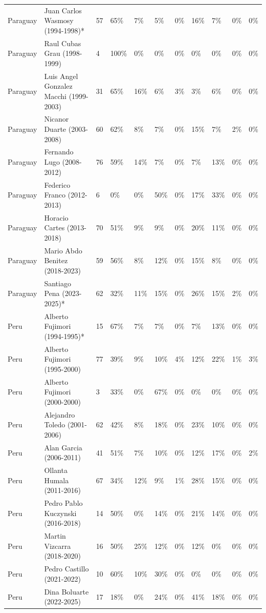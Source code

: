 \documentclass[11pt,a4paper]{article}
\begin{document}
\begin{longtable}{lllllllllll}
  Paraguay & Juan Carlos Wasmosy (1994-1998)* & 57 & 65\% & 7\% & 5\% & 0\% & 16\% & 7\% & 0\% & 0\% \\ 
  Paraguay & Raul Cubas Grau (1998-1999) & 4 & 100\% & 0\% & 0\% & 0\% & 0\% & 0\% & 0\% & 0\% \\ 
  Paraguay & Luis Angel Gonzalez Macchi (1999-2003) & 31 & 65\% & 16\% & 6\% & 3\% & 3\% & 6\% & 0\% & 0\% \\ 
  Paraguay & Nicanor Duarte (2003-2008) & 60 & 62\% & 8\% & 7\% & 0\% & 15\% & 7\% & 2\% & 0\% \\ 
  Paraguay & Fernando Lugo (2008-2012) & 76 & 59\% & 14\% & 7\% & 0\% & 7\% & 13\% & 0\% & 0\% \\ 
  Paraguay & Federico Franco (2012-2013) & 6 & 0\% & 0\% & 50\% & 0\% & 17\% & 33\% & 0\% & 0\% \\ 
  Paraguay & Horacio Cartes (2013-2018) & 70 & 51\% & 9\% & 9\% & 0\% & 20\% & 11\% & 0\% & 0\% \\ 
  Paraguay & Mario Abdo Benitez (2018-2023) & 59 & 56\% & 8\% & 12\% & 0\% & 15\% & 8\% & 0\% & 0\% \\ 
  Paraguay & Santiago Pena (2023-2025)* & 62 & 32\% & 11\% & 15\% & 0\% & 26\% & 15\% & 2\% & 0\% \\ 
  Peru & Alberto Fujimori (1994-1995)* & 15 & 67\% & 7\% & 7\% & 0\% & 7\% & 13\% & 0\% & 0\% \\ 
  Peru & Alberto Fujimori (1995-2000) & 77 & 39\% & 9\% & 10\% & 4\% & 12\% & 22\% & 1\% & 3\% \\ 
  Peru & Alberto Fujimori (2000-2000) & 3 & 33\% & 0\% & 67\% & 0\% & 0\% & 0\% & 0\% & 0\% \\ 
  Peru & Alejandro Toledo (2001-2006) & 62 & 42\% & 8\% & 18\% & 0\% & 23\% & 10\% & 0\% & 0\% \\ 
  Peru & Alan Garcia (2006-2011) & 41 & 51\% & 7\% & 10\% & 0\% & 12\% & 17\% & 0\% & 2\% \\ 
  Peru & Ollanta Humala (2011-2016) & 67 & 34\% & 12\% & 9\% & 1\% & 28\% & 15\% & 0\% & 0\% \\ 
  Peru & Pedro Pablo Kuczynski (2016-2018) & 14 & 50\% & 0\% & 14\% & 0\% & 21\% & 14\% & 0\% & 0\% \\ 
  Peru & Martin Vizcarra (2018-2020) & 16 & 50\% & 25\% & 12\% & 0\% & 12\% & 0\% & 0\% & 0\% \\ 
  Peru & Pedro Castillo (2021-2022) & 10 & 60\% & 10\% & 30\% & 0\% & 0\% & 0\% & 0\% & 0\% \\ 
  Peru & Dina Boluarte (2022-2025) & 17 & 18\% & 0\% & 24\% & 0\% & 41\% & 18\% & 0\% & 0\% \\ 

\end{longtable}
\end{document}
